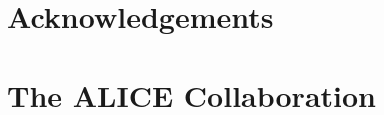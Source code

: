 \documentclass[ALICE,manyauthors]{cernphprep}
\begin{document}
\setcounter{page}{2} %


 
 
 









\newenvironment{acknowledgement}{\relax}{\relax}
\begin{acknowledgement}
\section*{Acknowledgements}

\end{acknowledgement}



\newpage
\appendix

%
%

\section{The ALICE Collaboration}
\label{app:collab}

\end{document}
